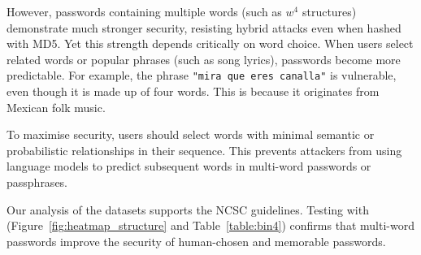 However, passwords containing multiple words (such as $w^4$ structures) demonstrate much stronger security, resisting hybrid attacks even when hashed with MD5. Yet this strength depends critically on word choice. When users select related words or popular phrases (such as song lyrics), passwords become more predictable. For example, the phrase \texttt{"mira que eres canalla"} is vulnerable, even though it is made up of four words. This is because it originates from Mexican folk music.

To maximise security, users should select words with minimal semantic or probabilistic relationships in their sequence. This prevents attackers from using language models to predict subsequent words in multi-word passwords or passphrases.

Our analysis of the \pwdninja datasets supports the NCSC guidelines. Testing with \zxcvbn (Figure~\ref{fig:heatmap_structure} and Table~\ref{table:bin4}) confirms that multi-word passwords improve the security of human-chosen and memorable passwords.

